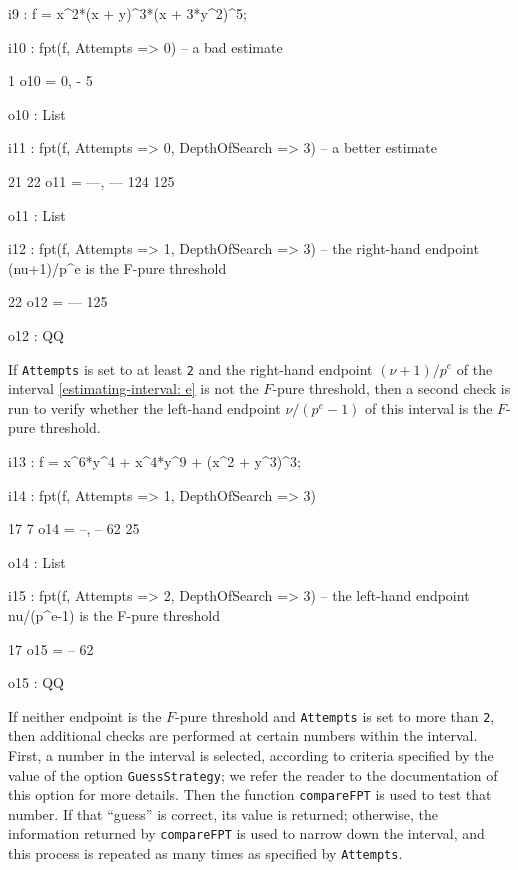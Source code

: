 \documentclass{amsart}
\begin{document}
\medskip
{\small
{}
\begin{MyVerbatim}
i9 : f = x^2*(x + y)^3*(x + 3*y^2)^5;

i10 : fpt(f, Attempts => 0) -- a bad estimate

          1
o10 = {0, -}
          5

o10 : List

i11 : fpt(f, Attempts => 0, DepthOfSearch => 3) -- a better estimate

        21   22
o11 = {---, ---}
       124  125

o11 : List

i12 : fpt(f, Attempts => 1, DepthOfSearch => 3) -- the right-hand
      endpoint (nu+1)/p^e is the F-pure threshold

       22
o12 = ---
      125

o12 : QQ
\end{MyVerbatim}
}
\medskip

If  \texttt{Attempts} is set to at least \texttt{2} and the right-hand endpoint $(\nu+1)/p^e$ of the interval \eqref{estimating-interval: e} is not the $F$-pure threshold, then a second check is run to verify whether the left-hand endpoint $\nu/(p^e-1)$ of this interval is the $F$-pure threshold.

\medskip
{\small
{}
\begin{MyVerbatim}
i13 : f = x^6*y^4 + x^4*y^9 + (x^2 + y^3)^3;

i14 : fpt(f, Attempts => 1, DepthOfSearch => 3)

       17   7
o14 = {--, --}
       62  25

o14 : List

i15 : fpt(f, Attempts => 2, DepthOfSearch => 3) -- the left-hand endpoint
      nu/(p^e-1) is the F-pure threshold

      17
o15 = --
      62

o15 : QQ
\end{MyVerbatim}
}
\medskip

If neither endpoint is the $F$-pure threshold and \texttt{Attempts} is set to more than \texttt{2}, then  additional checks are performed at certain numbers within the interval.
First, a number in the interval is selected, according to criteria specified by the value of the option \texttt{GuessStrategy}; we refer the reader to the documentation of this option for more details.
Then the function \texttt{compareFPT} is used to test that number. If that ``guess'' is correct, its value is returned; otherwise, the information returned by \texttt{compareFPT} is used to narrow down the interval, and this process is repeated as many times as specified by \texttt{Attempts}.
\end{document}
